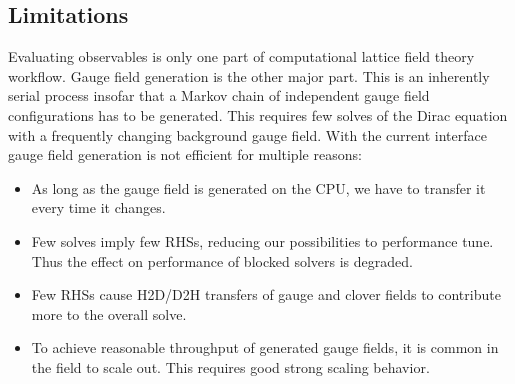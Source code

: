 \subsection{Limitations}

Evaluating observables is only one part of computational lattice field theory workflow.
Gauge field generation is the other major part.
This is an inherently serial process insofar that a Markov chain of independent gauge field configurations has to be generated.
This requires few solves of the Dirac equation with a frequently changing background gauge field.
With the current interface gauge field generation is not efficient for multiple reasons:
\begin{itemize}
    \item As long as the gauge field is generated on the CPU, we have to transfer it every time it changes.
    \item Few solves imply few RHSs, reducing our possibilities to performance tune. Thus the effect on performance of blocked solvers is degraded.
    \item Few RHSs cause H2D/D2H transfers of gauge and clover fields to contribute more to the overall solve.
    \item To achieve reasonable throughput of generated gauge fields, it is common in the field to scale out. This requires good strong scaling behavior.
\end{itemize}




